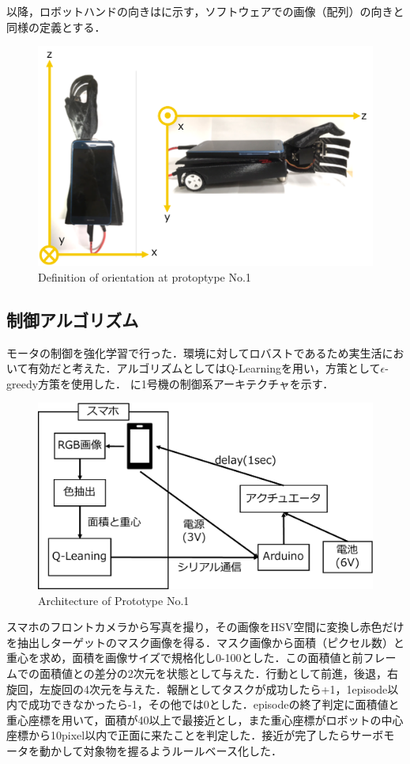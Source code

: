 以降，ロボットハンドの向きはに示す，ソフトウェアでの画像（配列）の向きと同様の定義とする．
\begin{figure}[H]
    \centering
    \includegraphics[width=0.7\linewidth]{figure/chapter3/1号機向き}
    \caption{Definition of orientation at protoptype No.1}
    \label{fig:1号機向き}
\end{figure}



\subsection{制御アルゴリズム}

モータの制御を強化学習で行った．環境に対してロバストであるため実生活において有効だと考えた．アルゴリズムとしてはQ-Learningを用い，方策として$\epsilon$-greedy方策を使用した．
に1号機の制御系アーキテクチャを示す．

\begin{figure}[H]
    \centering
    \includegraphics[width=0.7\linewidth]{figure/chapter3/1号機制御図}
    \caption{Architecture of Prototype No.1}
    \label{fig:1号機制御図}
\end{figure}

スマホのフロントカメラから写真を撮り，その画像をHSV空間に変換し赤色だけを抽出しターゲットのマスク画像を得る．マスク画像から面積（ピクセル数）と重心を求め，面積を画像サイズで規格化し0-100とした．この面積値と前フレームでの面積値との差分の2次元を状態として与えた．行動として前進，後退，右旋回，左旋回の4次元を与えた．報酬としてタスクが成功したら+1，1episode以内で成功できなかったら-1，その他では0とした．episodeの終了判定に面積値と重心座標を用いて，面積が40以上で最接近とし，また重心座標がロボットの中心座標から10pixel以内で正面に来たことを判定した．接近が完了したらサーボモータを動かして対象物を握るようルールベース化した．

